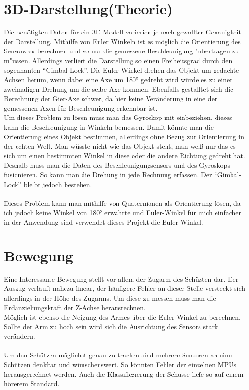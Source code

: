 \section{3D-Darstellung(Theorie)}
Die benötigten Daten für ein 3D-Modell varierien je nach gewollter Genauigkeit der Darstellung.
Mithilfe von Euler Winkeln ist es möglich die Orientierung des Sensors zu berechnen und so nur
die gemessene Beschleunigung "ubertragen zu m"ussen. Allerdings verliert die Darstellung so einen
Freiheitsgrad durch den sogennanten ``Gimbal-Lock''. Die Euler Winkel drehen das Objekt um gedachte
Achsen herum, wenn dabei eine Axe um 180° gedreht wird würde es zu einer zweimaligen Drehung
um die selbe Axe kommen. Ebenfalls gestalltet sich die Berechnung der Gier-Axe schwer, da hier
keine Veränderung in eine der gemessenen Axen für Beschleunigung erkennbar ist.
\\
Um dieses Problem zu lösen muss man das Gyroskop mit einbeziehen, dieses kann die Beschleunigung
in Winkeln bemessen. Damit könnte man die Orientierung eines Objekt bestimmen, allerdings ohne 
Bezug zur Orientierung in der echten Welt. Man wüsste nicht wie das Objekt steht, man weiß nur 
das es sich um einen bestimmten Winkel in diese oder die andere Richtung gedreht hat. \\
Deshalb muss man die Daten des Beschleunigungsensors und des Gyroskops fusionieren. So kann man 
die Drehung in jede Rechnung erfassen. Der ``Gimbal-Lock'' bleibt jedoch bestehen.\\
\\
Dieses Problem kann man mithilfe von Quaternionen als Orientierung lösen, da ich jedoch keine 
Winkel von 180° erwahrte und Euler-Winkel für mich einfacher in der Anwendung sind verwendet
dieses Projekt die Euler-Winkel. 

\section {Bewegung}
Eine Interessante Bewegung stellt vor allem der Zugarm des 
Schüzten dar. Der Auszug verläuft nahezu linear, der häufigere Fehler 
an dieser Stelle versteckt sich allerdings in der Höhe des Zugarms. 
Um diese zu messen muss man die Erdanziehungskraft der Z-Achse herausrechnen.\\
Möglich ist ebenso die Neigung des Armes über die Euler-Winkel zu berechnen. Sollte 
der Arm zu hoch sein wird sich die Ausrichtung des Sensors stark verändern.\\
\\
Um den Schützen möglichst genau zu tracken sind mehrere Sensoren an eine Schützen denkbar und
wünschenswert. So könnten Fehler der einzelnen MPUs herausgerechnet werden.
Auch die Klassifiezierung der Schüsse liefe so auf einem hörerem Standard.
\\




